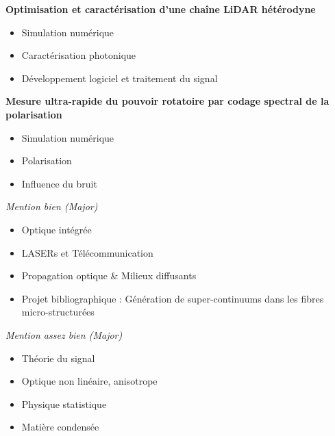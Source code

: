 \documentclass[9pt,a4paper,academicons]{altacv}
\begin{document}
\divider


\textbf{Optimisation et caractérisation d'une chaîne LiDAR hétérodyne}
\small{
	\begin{itemize}
		\item Simulation numérique
		\item Caractérisation photonique
		\item Développement logiciel et traitement du signal
	\end{itemize}
}

\divider


\textbf{Mesure ultra-rapide du pouvoir rotatoire par codage spectral de la
	polarisation}
\small{
	\begin{itemize}
		\item Simulation numérique
		\item Polarisation
		\item Influence du bruit
	\end{itemize}
}





\textit{Mention bien (Major)}\smallskip
\small{
  \begin{itemize}
    \item Optique intégrée
    \item LASERs et Télécommunication
    \item Propagation optique \& Milieux diffusants
    \item Projet bibliographique : Génération de super-continuums dans les fibres micro-structurées
  \end{itemize}
}

\divider

\textit{Mention assez bien (Major)}\smallskip
\small{
  \begin{itemize}
    \item Théorie du signal
    \item Optique non linéaire, anisotrope
    \item Physique statistique
    \item Matière condensée
  \end{itemize}
}
\divider
\end{document}
